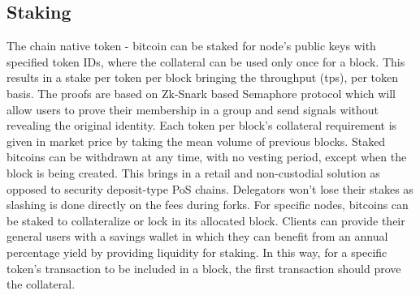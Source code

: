 \documentclass[../Bitcoin Blink.tex]{subfiles}
\begin{document}
\subsection{Staking}
The chain native token - bitcoin can be staked for node's public keys with specified token IDs, where the collateral can be used only once for a block. This results in a stake per token per block bringing the throughput (tps), per token basis. The proofs are based on Zk-Snark based Semaphore protocol \cite{semaphore} which will allow users to prove their membership in a group and send signals without revealing the original identity. Each token per block's collateral requirement is given in market price by taking the mean volume of previous blocks. Staked bitcoins can be withdrawn at any time, with no vesting period, except when the block is being created. This brings in a retail and non-custodial solution as opposed to security deposit-type PoS chains. Delegators won't lose their stakes as slashing is done directly on the fees during forks. For specific nodes, bitcoins can be staked to collateralize or lock in its allocated block. Clients can provide their general users with a savings wallet in which they can benefit from an annual percentage yield by providing liquidity for staking. In this way, for a specific token's transaction to be included in a block, the first transaction should prove the collateral.
\end{document}
